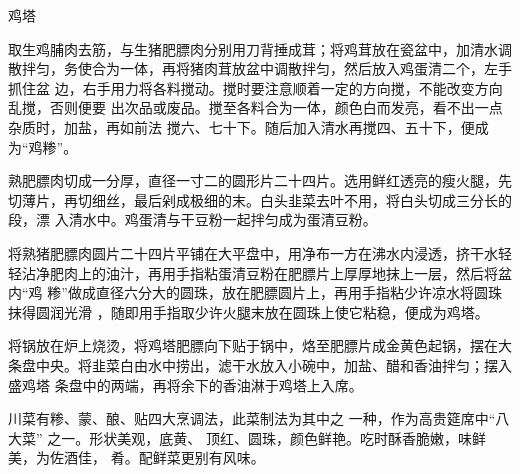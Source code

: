 \begin{recipe}[金钱鸡塔]{鸡塔}

\ingredients


\preparation

\step 取生鸡脯肉去筋，与生猪肥膘肉分别用刀背捶成茸；将鸡茸放在瓷盆中，加清水调
散拌匀，务使合为一体，再将猪肉茸放盆中调散拌匀，然后放入鸡蛋清二个，左手抓住盆
边，右手用力将各料搅动。搅时要注意顺着一定的方向搅，不能改变方向乱搅，否则便要
出次品或废品。搅至各料合为一体，颜色白而发亮，看不出一点杂质时，加盐，再如前法
搅六、七十下。随后加入清水再搅四、五十下，便成为“鸡糁”。

\step 熟肥膘肉切成一分厚，直径一寸二的圆形片二十四片。选用鲜红透亮的瘦火腿，先
切薄片，再切细丝，最后剁成极细的末。白头韭菜去叶不用，将白头切成三分长的段，漂
入清水中。鸡蛋清与干豆粉一起拌匀成为蛋清豆粉。

\step 将熟猪肥膘肉圆片二十四片平铺在大平盘中，用净布一方在沸水内浸透，挤干水轻
轻沾净肥肉上的油汁，再用手指粘蛋清豆粉在肥膘片上厚厚地抹上一层，然后将盆内“鸡
糁”做成直径六分大的圆珠，放在肥膘圆片上，再用手指粘少许凉水将圆珠抹得圆润光滑
，随即用手指取少许火腿末放在圆珠上使它粘稳，便成为鸡塔。

\step 将锅放在炉上烧烫，将鸡塔肥膘向下贴于锅中，烙至肥膘片成金黄色起锅，摆在大
条盘中央。将韭菜白由水中捞出，滤干水放入小碗中，加盐、醋和香油拌匀；摆入盛鸡塔
条盘中的两端，再将余下的香油淋于鸡塔上入席。

\features

川菜有糁、蒙、酿、贴四大烹调法，此菜制法为其中之 一种，作为高贵筵席中“八大菜”
之一。形状美观，底黄、 顶红、圆珠，颜色鲜艳。吃时酥香脆嫩，味鲜美，为佐酒佳，
肴。配鲜菜更别有风味。

\end{recipe}

